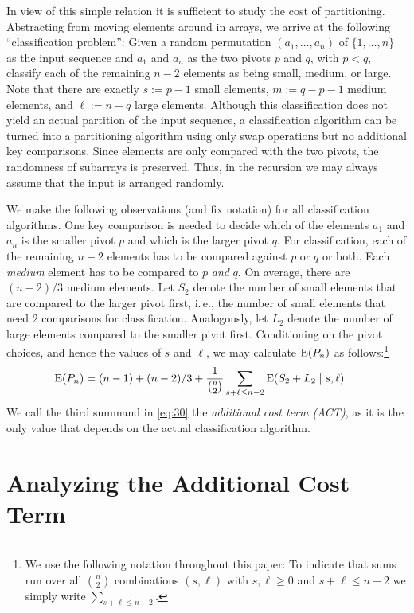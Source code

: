 \documentclass[prodmode,acmtalg]{acmsmall}
\newcommand{\E}{\textnormal{\textrm{E}}}
\begin{document}
In view of this simple relation it is sufficient to study the cost of partitioning.
Abstracting from moving elements around in arrays, we arrive at the following
``classification problem'':
Given a random permutation $(a_1,\ldots,a_n)$ of $\{1,\ldots,n\}$ as the input
sequence and $a_1$ and $a_n$ as the two pivots $p$ and $q$, with $p < q$,
classify each of the remaining $n-2$ elements as being small, medium, or large.
Note that there are exactly
$s:=p-1$ small elements, $m := q - p - 1$ medium elements, and $\ell:=n-q$ large
elements. 
Although this
classification does not yield an actual partition of the input sequence, 
a classification algorithm can be turned into a partitioning algorithm using
only swap operations
but no additional key comparisons. Since elements are only
compared with the two pivots, the randomness of subarrays is preserved. Thus,
in the recursion we may always assume that the input is arranged randomly.

We make the following observations (and fix notation) for all classification
algorithms.  One key comparison is needed to decide which of the elements $a_1$
and $a_n$ is the smaller pivot $p$ and which is the larger pivot $q$.  For
classification, each of the remaining $n-2$ elements has to be compared against
$p$ or $q$ or both. Each \emph{medium} element has to be compared to $p$
\emph{and} $q$. On average, there are $(n-2)/3$ medium elements. Let $S_2$
denote the number of small elements that are compared to the larger pivot first,
i.\,e., the number of small elements that need $2$ comparisons for classification.
Analogously, let $L_2$ denote the number of large elements compared to the
smaller pivot first. Conditioning on the pivot choices, and hence the values of
$s$ and $\ell$, we may calculate $\E(P_n)$ as follows:\footnote{We use
the following notation throughout this paper: To indicate that sums run over all 
$\binom{n}{2}$ combinations $(s,\ell)$ with $s, \ell \geq 0$ and $s + \ell \leq n - 2$
we simply write $\sum_{s + \ell \leq n - 2}$.}
\begin{align}\label{eq:30}
    \E(P_n) &= (n - 1) + (n-2)/3 + \frac{1}{\binom{n}{2}} \sum_{s+\ell \leq n-2}\E(S_2 + L_2 \mid s, \ell).
\end{align}
We call the third summand in \eqref{eq:30} the \emph{additional cost term (ACT)}, as it is the only
value that depends on the actual classification algorithm.

\section{Analyzing the Additional Cost Term}\label{sec:additional:cost:term}
\end{document}
